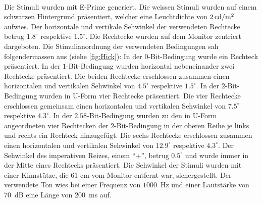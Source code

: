 \documentclass[11pt, twoside, a4paper]{book}		%
\begin{document}
Die Stimuli wurden mit E-Prime\textsuperscript{\textregistered} \citep{eprime} generiert. Die weissen Stimuli wurden auf einem schwarzen Hintergrund präsentiert, welcher eine Leuchtdichte von $2\,\textnormal{cd}/ \textnormal{m}^2$ aufwies. Der horizontale und vertikale Sehwinkel der verwendeten Rechtecke betrug $1.8^{\circ}$ respektive $1.5^{\circ}$. Die Rechtecke wurden auf dem Monitor zentriert dargeboten. Die Stimulianordnung der verwendeten Bedingungen sah folgendermassen aus (siehe \autoref{fig:Hick}):  In der $0$-Bit-Bedingung wurde ein Rechteck präsentiert. In der $1$-Bit-Bedingung wurden horizontal nebeneinander zwei Rechtecke präsentiert. Die beiden Rechtecke erschlossen zusammen einen horizontalen und vertikalen Sehwinkel von $4.5^{\circ}$ respektive $1.5^{\circ}$. In der $2$-Bit-Bedingung wurden in U-Form vier Rechtecke präsentiert. Die vier Rechtecke erschlossen gemeinsam einen horizontalen und vertikalen Sehwinkel von $7.5^{\circ}$ respektive $4.3^{\circ}$. In der $2.58$-Bit-Bedingung wurden zu den in U-Form angeordneten vier Rechtecken der $2$-Bit-Bedingung in der oberen Reihe je links und rechts ein Rechteck hinzugefügt. Die sechs Rechtecke erschlossen zusammen einen horizontalen und vertikalen Sehwinkel von $12.9^{\circ}$ respektive $4.3^{\circ}$. Der Sehwinkel des imperativen Reizes, einem \enquote{+}, betrug $0.5^{\circ}$ und wurde  immer in der Mitte eines Rechtecks präsentiert. Die Sehwinkel der Stimuli wurden mit einer Kinnstütze, die $61$ cm vom Monitor entfernt war, sichergestellt. Der verwendete Ton wies bei einer Frequenz von $1000$~Hz und einer Lautstärke von $70$~dB eine Länge von $200$~ms auf.
\end{document}
